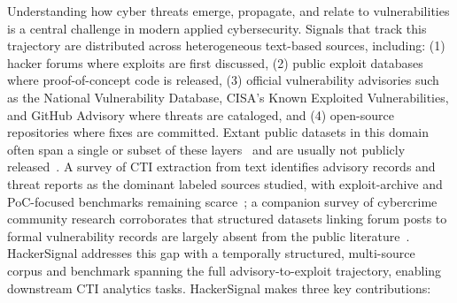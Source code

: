 \documentclass{article}
\begin{document}
Understanding how cyber threats emerge, propagate, and relate to vulnerabilities is a central challenge in modern applied cybersecurity. Signals that track this trajectory are distributed across heterogeneous text-based sources, including: (1) hacker forums where exploits are first discussed, (2) public exploit databases where proof-of-concept code is released, (3) official vulnerability advisories such as the National Vulnerability Database, CISA's Known Exploited Vulnerabilities, and GitHub Advisory where threats are cataloged, and (4) open-source repositories where fixes are committed. Extant public datasets in this domain often span a single or subset of these layers~\citep{crimebb2018} and are usually not publicly released~\citep{ampel2020dtl}. A survey of CTI extraction from text identifies advisory records and threat reports as the dominant labeled sources studied, with exploit-archive and PoC-focused benchmarks remaining scarce~\citep{rahman2023cti}; a companion survey of cybercrime community research corroborates that structured datasets linking forum posts to formal vulnerability records are largely absent from the public literature~\citep{hughes2024cybercrime}. HackerSignal addresses this gap with a temporally structured, multi-source corpus and benchmark spanning the full advisory-to-exploit trajectory, enabling downstream CTI analytics tasks. HackerSignal makes three key contributions:
\end{document}
